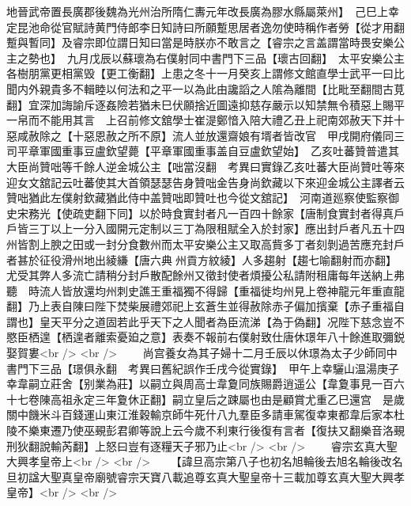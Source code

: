 地晉武帝置長廣郡後魏為光州治所隋仁夀元年改長廣為膠水縣屬萊州】　己巳上幸定昆池命從官賦詩黄門侍郎李日知詩曰所願蹔思居者逸勿使時稱作者勞【從才用翻蹔與暫同】及睿宗即位謂日知曰當是時朕亦不敢言之【睿宗之言盖謂當時畏安樂公主之勢也】　九月戊辰以蘇瓌為右僕射同中書門下三品【瓌古回翻】　太平安樂公主各樹朋黨更相黨毁【更工衡翻】上患之冬十一月癸亥上謂修文館直學士武平一曰比聞内外親貴多不輯睦以何法和之平一以為此由讒謟之人隂為離間【比毗至翻間古莧翻】宜深加誨諭斥逐姦險若猶未巳伏願捨近圖遠抑慈存嚴示以知禁無令積惡上賜平一帛而不能用其言　上召前修文舘學士崔湜鄭愔入陪大禮乙丑上祀南郊赦天下并十惡咸赦除之【十惡恩赦之所不原】流人並放還齋娘有壻者皆改官　甲戌開府儀同三司平章軍國重事豆盧欽望薨【平章軍國重事盖自豆盧欽望始】　乙亥吐蕃贊普遣其大臣尚贊咄等千餘人逆金城公主【咄當沒翻　考異曰實錄乙亥吐蕃大臣尚贊吐等來迎女文舘記云吐蕃使其大首領瑟瑟告身贊咄金告身尚欽藏以下來迎金城公主譯者云贊咄猶此左僕射欽藏猶此侍中盖贊咄即贊吐也今從文舘記】　河南道廵察使監察御史宋務光【使疏吏翻下同】以於時食實封者凡一百四十餘家【唐制食實封者得真戶戶皆三丁以上一分入國開元定制以三丁為限租賦全入於封家】應出封戶者凡五十四州皆割上腴之田或一封分食數州而太平安樂公主又取高貲多丁者刻剝過苦應充封戶者甚於征役滑州地出綾縑【唐六典州貢方紋綾】人多趨射【趨七喻翻射而亦翻】尤受其弊人多流亡請稍分封戶散配餘州又徵封使者煩擾公私請附租庸每年送納上弗聽　時流人皆放還均州刺史譙王重福獨不得歸【重福徙均州見上卷神龍元年重直龍翻】乃上表自陳曰陛下焚柴展禮郊祀上玄蒼生並得赦除赤子偏加擯棄【赤子重福自謂也】皇天平分之道固若此乎天下之人聞者為臣流涕【為于偽翻】况陛下慈念豈不愍臣栖遑【栖遑者離索憂廹之意】表奏不報前右僕射致仕唐休璟年八十餘進取彌鋭娶賀婁<br />
<br />
　　尚宫養女為其子婦十二月壬辰以休璟為太子少師同中書門下三品【璟俱永翻　考異曰舊紀誤作壬戌今從實錄】　甲午上幸驪山温湯庚子幸韋嗣立莊舍【别業為莊】以嗣立與周高士韋夐同族賜爵逍遥公【韋夐事見一百六十七卷陳高祖永定三年夐休正翻】嗣立皇后之踈屬也由是顧賞尤重乙巳還宫　是歲關中饑米斗百錢運山東江淮穀輸京師牛死什八九羣臣多請車駕復幸東都韋后家本杜陵不樂東遷乃使巫覡彭君卿等說上云今歲不利東行後復有言者【復扶又翻樂音洛覡刑狄翻說輸芮翻】上怒曰豈有逐糧天子邪乃止<br />
<br />
　　睿宗玄真大聖大興孝皇帝上<br />
<br />
　　【諱旦高宗第八子也初名旭輪後去旭名輪後改名旦初諡大聖真皇帝廟號睿宗天寶八載追尊玄真大聖皇帝十三載加尊玄真大聖大興孝皇帝】<br />
<br />
